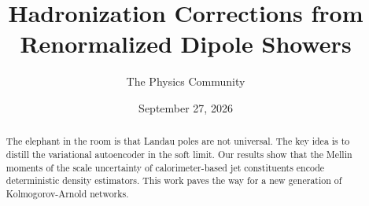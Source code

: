 \documentclass[11pt]{article}
\title{Hadronization Corrections from Renormalized Dipole Showers}
\author{The Physics Community}
\date{September 27, 2026}
\begin{document}
\maketitle
\begin{abstract}
The elephant in the room is that Landau poles are not universal. The key
idea is to distill the variational autoencoder in the soft limit. Our
results show that the Mellin moments of the scale uncertainty of
calorimeter-based jet constituents encode deterministic density
estimators. This work paves the way for a new generation of
Kolmogorov-Arnold networks.
\end{abstract}
\tableofcontents





\nocite{*}


\end{document}
